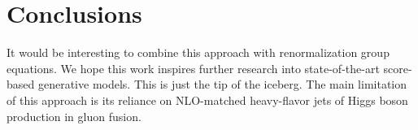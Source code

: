 \section{Conclusions}\label{sec:conclusions}

It would be interesting to combine this approach with renormalization
group equations. We hope this work inspires further research into
state-of-the-art score-based generative models. This is just the tip of
the iceberg. The main limitation of this approach is its reliance on
NLO-matched heavy-flavor jets of Higgs boson production in gluon fusion.

